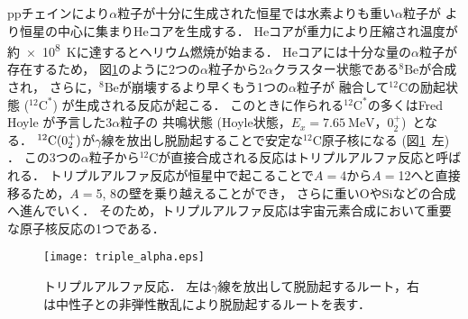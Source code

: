 \documentclass[../master]{subfiles}
\begin{document}
ppチェインにより$\alpha$粒子が十分に生成された恒星では水素よりも重い$\alpha$粒子が
より恒星の中心に集まり$\mathrm{He}$コアを生成する．
$\mathrm{He}$コアが重力により圧縮され温度が約\SI{e8}{\kelvin}に達するとヘリウム燃焼が始まる．
$\mathrm{He}$コアには十分な量の$\alpha$粒子が存在するため，
図\ref{fig::triple_alpha}のように2つの$\alpha$粒子から2$\alpha$クラスター状態である${}^{8}\mathrm{Be}$が合成され，
さらに，${}^{8}\mathrm{Be}$が崩壊するより早くもう1つの$\alpha$粒子が
融合して${}^{12}\mathrm{C}$の励起状態 (${}^{12}\mathrm{C}^{*}$) が生成される反応が起こる．
このときに作られる${}^{12}\mathrm{C}^{*}$の多くはFred Hoyle が予言した$3\alpha$粒子の
共鳴状態 (Hoyle状態，$E_{x} = \SI{7.65}{\mega\electronvolt}$，$0_{2}^{+}$)~\cite{hoyle_state}となる．
${}^{12}{\rm C} (0_2^+)$が$\gamma$線を放出し脱励起することで安定な${}^{12}\mathrm{C}$原子核になる
 (図\ref{fig::triple_alpha}~左) ．
この3つの$\alpha$粒子から${}^{12}\mathrm{C}$が直接合成される反応はトリプルアルファ反応と呼ばれる．
トリプルアルファ反応が恒星中で起こることで$A = $4から$A = $12へと直接移るため，$A = $5, 8の壁を乗り越えることができ，
さらに重い$\mathrm{O}$や$\mathrm{Si}$などの合成へ進んでいく．
そのため，トリプルアルファ反応は宇宙元素合成において重要な原子核反応の1つである．
\begin{figure}
  \centering
  \texttt{[image: triple\_alpha.eps]}
  \caption[トリプルアルファ反応．]{トリプルアルファ反応．
    左は$\gamma$線を放出して脱励起するルート，右は中性子との非弾性散乱により脱励起するルートを表す．}
  \label{fig::triple_alpha}
\end{figure}
\end{document}
